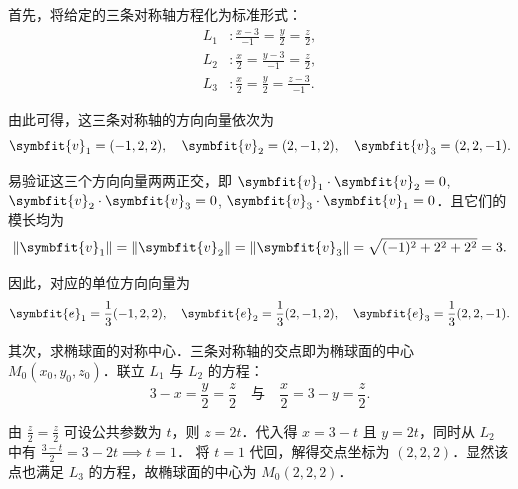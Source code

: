 \begin{solution}
    首先，将给定的三条对称轴方程化为标准形式：
    \begin{equation}
        \begin{aligned}
            L_1 & \colon \frac{x - 3}{-1} = \frac{y}{2} = \frac{z}{2}, \\
            L_2 & \colon \frac{x}{2} = \frac{y - 3}{-1} = \frac{z}{2}, \\
            L_3 & \colon \frac{x}{2} = \frac{y}{2} = \frac{z - 3}{-1}.
        \end{aligned}
    \end{equation}

    由此可得，这三条对称轴的方向向量依次为
    \begin{equation}
        \symbfit{v}_1 = (-1, 2, 2), \quad \symbfit{v}_2 = (2, -1, 2), \quad \symbfit{v}_3 = (2, 2, -1).
    \end{equation}

    易验证这三个方向向量两两正交，即 $\symbfit{v}_1 \cdot \symbfit{v}_2 = 0$, $\symbfit{v}_2 \cdot \symbfit{v}_3 = 0$, $\symbfit{v}_3 \cdot \symbfit{v}_1 = 0$．且它们的模长均为
    \begin{equation}
        \|\symbfit{v}_1\| = \|\symbfit{v}_2\| = \|\symbfit{v}_3\| = \sqrt{(-1)^2 + 2^2 + 2^2} = 3.
    \end{equation}

    因此，对应的单位方向向量为
    \begin{equation}
        \symbfit{e}_1 = \frac{1}{3}(-1, 2, 2), \quad \symbfit{e}_2 = \frac{1}{3}(2, -1, 2), \quad \symbfit{e}_3 = \frac{1}{3}(2, 2, -1).
    \end{equation}

    其次，求椭球面的对称中心．三条对称轴的交点即为椭球面的中心 $M_0(x_0, y_0, z_0)$．联立 $L_1$ 与 $L_2$ 的方程：
    \begin{equation}
        3 - x = \frac{y}{2} = \frac{z}{2} \quad \text{与} \quad \frac{x}{2} = 3 - y = \frac{z}{2}.
    \end{equation}

    由 $\frac{z}{2} = \frac{z}{2}$ 可设公共参数为 $t$，则 $z = 2t$．代入得 $x = 3 - t$ 且 $y = 2t$，同时从 $L_2$ 中有 $\frac{3 - t}{2} = 3 - 2t \implies t = 1$．
    将 $t = 1$ 代回，解得交点坐标为 $(2, 2, 2)$．显然该点也满足 $L_3$ 的方程，故椭球面的中心为 $M_0(2, 2, 2)$．


\end{solution}
